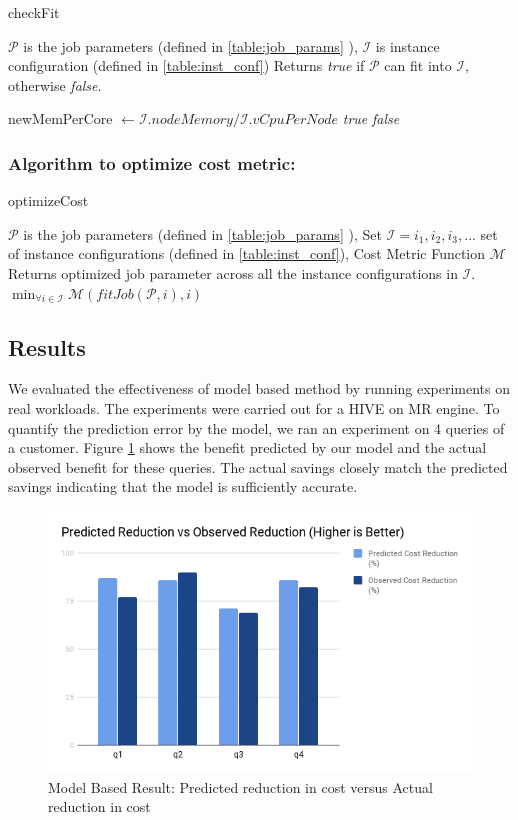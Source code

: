 \begin{algorithm}
\caption{checkFit} \label{checkfit}
\begin{algorithmic}[1]
\footnotesize
\REQUIRE $\mathcal{P}$ is the job parameters (defined in \ref{table:job_params} ), $\mathcal{I}$  is instance configuration (defined in \ref{table:inst_conf})
\ENSURE Returns \textit{true} if $\mathcal{P}$ can fit into $\mathcal{I}$, otherwise \textit{false}.

\STATE newMemPerCore $\gets \mathcal{I}.nodeMemory / \mathcal{I}.vCpuPerNode$
\RETURN \textit{true}
\ELSE
\RETURN \textit{false}
\ENDIF
\end{algorithmic}
\end{algorithm}

\noindent\subsubsection*{\bf Algorithm to optimize cost metric:}

\begin{algorithm}
\caption{optimizeCost} \label{cost_optimize}
\begin{algorithmic}[1]
\footnotesize
\REQUIRE $\mathcal{P}$ is the job parameters (defined in \ref{table:job_params} ), Set $\mathcal{I} = {i_1, i_2, i_3, ...} $ set of instance configurations (defined in \ref{table:inst_conf}), Cost Metric Function $\mathcal{M}$
\ENSURE Returns optimized job parameter across all the instance configurations in $\mathcal{I}$.
\RETURN $\min_{\forall i \in \mathcal{I}} \mathcal{M}(fitJob(\mathcal{P}, i), i)$
\end{algorithmic}
\end{algorithm}

\subsection{Results}
We evaluated the effectiveness of model based method by running experiments on real workloads. The experiments were carried out for a HIVE on MR engine. To quantify the prediction error by the model, we ran an experiment on 4 queries of a customer. Figure \ref{fig:modelbasedresult} shows the benefit predicted by our model and the actual observed benefit for these queries. The actual savings closely match the predicted savings indicating that the model is sufficiently accurate.

\begin{figure}[h]
	\includegraphics[width=\linewidth]{chart.png}
	\caption{Model Based Result: Predicted reduction in cost versus Actual reduction in cost}
	\label{fig:modelbasedresult}
\end{figure}
